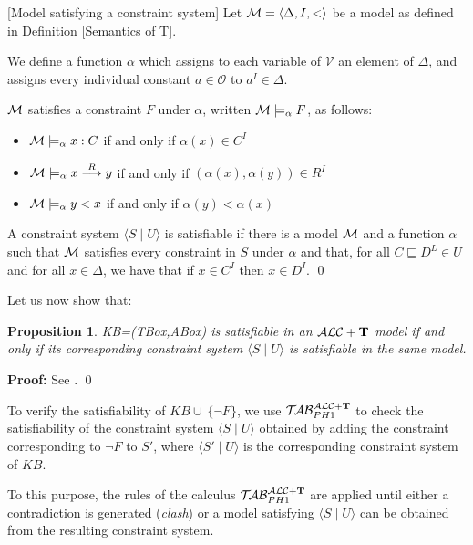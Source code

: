 \documentclass[a4paper, 11pt, oneside]{duthesis}
\newcommand{\tip}{{\bf T}}
\newcommand{\alct}{\mathcal{ALC}+\tip}
\newcommand{\unione} {\cup}
\newcommand{\nott} {\lnot}
\newcommand{\tc} {\mid}
\newcommand{\sx} {\langle}
\newcommand{\dx} {\rangle}
\newcommand{\emme} {\begin{mathcal}M\end{mathcal}}
\newcommand{\primo}{\mathrel{{\mathcal{T}\!\mathcal{AB}}}_{PH 1}^{\mathcal{ALC}+\mbox{\scriptsize $\tip$}}}
\newcommand{\trans}[1]{\stackrel{#1}{\longrightarrow}}
\newenvironment{proof}
{\begin{trivlist} \item[] {\bf Proof:}}%
{\qed \end{trivlist}}
\newenvironment{definition}
{\begin{defi} \rm}{\qed \end{defi}}
\newenvironment{proof}
{\begin{trivlist} \item[] {\bf Proof:}}%
{\qed \end{trivlist}}
\newenvironment{definition}
{\begin{defi} \rm}{\qed \end{defi}}
\newtheorem{definition}{Definition}
\newtheorem{proposition}{Proposition}
\newcounter{posu}
\newtheorem{proposition}[posu]{Proposition}
\newtheorem{definition}[posu]{Definition}
\newtheorem{proof}[posu]{Proof}
\begin{document}
\begin{definition}[Model satisfying a constraint system]\label{modello constraint}
Let $\emme=\sx \Delta, I, < \dx$ be a model as defined in Definition \ref{Semantics of T}.

We define a function $\alpha$ which assigns to each variable of $\mathcal{V}$ an element of $\Delta$, and assigns every individual constant $a \in \mathcal{O}$ to $a^{I} \in \Delta$.

$\emme$ satisfies  a constraint $F$ under $\alpha$, written $\emme \models_\alpha F$, as follows:

\begin{itemize}
 \item $\emme \models_\alpha x: C$  if and only if $\alpha(x) \in C^{I}$
 \item $\emme \models_\alpha x \trans{R} y$ if and only if $(\alpha(x),\alpha(y)) \in R^{I}$
 \item $\emme \models_\alpha y < x$ if and only if $\alpha(y) < \alpha(x)$
\end{itemize}

A constraint system $\sx S \tc U \dx$ is satisfiable if there is a model $\emme$ and a function $\alpha$ such that $\emme$ satisfies  every constraint in $S$ under $\alpha$ and that, for all $C \sqsubseteq D^L \in U$ and for all $x \in \Delta$, we have that if $x \in C^I$ then $x \in D^I$.
\end{definition}

Let us now show that:

\begin{proposition}\label{corresp constr system} KB=(TBox,ABox) is satisfiable in an $\alct$ model if
and only if its corresponding constraint system $\sx S \tc U \dx$ is satisfiable in the same model.
\end{proposition}

\begin{proof}
See \cite{Giordano:2013:NDL:2435476.2435957}.
\end{proof}


\noindent To verify the satisfiability of $KB \unione \ \{ \nott F\}$, we use $\primo$ to check the satisfiability of the constraint system $\sx S \tc U \dx$ obtained by adding the constraint corresponding to $\nott F$ to $S'$, where $\sx S' \tc U \dx$ is the corresponding constraint system of $KB$.

To this purpose, the rules of the calculus $\primo$ are applied until either a contradiction is generated (\emph{clash}) or a model satisfying $\sx S \tc U \dx$ can be obtained from the resulting constraint system.
\end{document}
